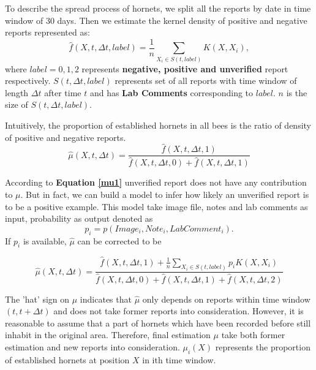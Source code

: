 \documentclass[12pt]{article}
\begin{document}
To describe the spread process of hornets, we split all the reports by date in time window of 30 days. Then we estimate the kernel density of positive and negative reports represented as:
\begin{equation}
	\hat{f}(X, t, \Delta t, label)=\frac{1}{n}\sum_{X_i\in S(t, label)}K\left(X, X_i\right),
\end{equation}
where $label=0,1,2$ represents \textbf{negative, positive and unverified} report respectively.  $S(t, \Delta t, label)$ represents set of all reports with time window of length $\Delta t$ after time $t$ and has \textbf{Lab Comments} corresponding to $label$. $n$ is the size of $S(t, \Delta t, label)$.

Intuitively, the proportion of established hornets in all bees is the ratio of density of positive and negative reports.
\begin{equation}
	\hat{\mu}(X, t, \Delta t) = \frac{\hat{{f}}(X, t, \Delta t, 1)}{\hat{{f}}(X, t, \Delta t, 0)+\hat{{f}}(X, t, \Delta t, 1)}
	\label{mu1}
\end{equation}

According to \textbf{Equation \ref{mu1}} unverified report does not have any contribution to $\mu $. But in fact, we can build a model to infer how likely an unverified report is to be a positive example. This model take image file, notes and lab comments as input, probability as output denoted as 
\begin{equation}
	p_i=p(Image_i, Note_i, LabComment_i).
\end{equation} If $p_i$ is available, $\hat{\mu}$ can be corrected to be 
	
\begin{equation}
	\hat{\mu}(X, t, \Delta t) = \frac{\hat{{f}}(X, t, \Delta t, 1)+\frac{1}{n}\sum_{X_i\in S(t, label)}p_iK\left(X, X_i\right)}{\hat{{f}}(X, t, \Delta t, 0)+\hat{{f}}(X, t, \Delta t, 1)+\hat{{f}}(X, t, \Delta t, 2)}
	\label{mu}
\end{equation}

The 'hat' sign on $\mu $ indicates that $\hat{\mu}$ only depends on reports within time window $(t, t+\Delta t)$ and does not take former reports into consideration. However, it is reasonable to assume that a part of hornets which have been recorded before still inhabit in the original area. Therefore, final estimation $\mu$ take both former estimation and new reports into consideration. $\mu_i(X)$ represents the proportion of established hornets at position $X$ in ith time window.
\end{document}

